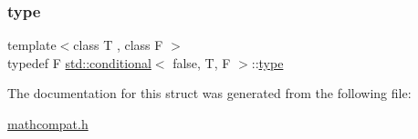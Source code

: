 \subsubsection{\texorpdfstring{type}{type}}
{\footnotesize\ttfamily template$<$class T , class F $>$ \\
typedef F \hyperlink{structstd_1_1conditional}{std\+::conditional}$<$ false, T, F $>$\+::\hyperlink{structstd_1_1conditional_3_01false_00_01T_00_01F_01_4_a8307a0010d68b8c7f309a910bb6137fe}{type}}



The documentation for this struct was generated from the following file\+:\begin{DoxyCompactItemize}
\item 
\hyperlink{mathcompat_8h}{mathcompat.\+h}\end{DoxyCompactItemize}
